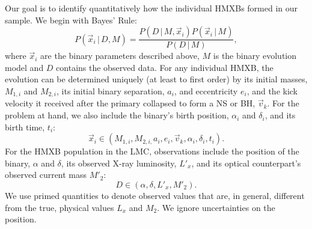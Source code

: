 \documentclass[12pt, preprint]{aastex}
\newcommand{\given}{\,|\,}
\begin{document}
Our goal is to identify quantitatively how the individual HMXBs formed in our sample. We begin with Bayes' Rule:
\begin{equation}
P( \vec{x}_i \given D, M ) = \frac{P( D \given M, \vec{x}_i ) P(\vec{x}_i \given M)}{P(D \given M)},
\end{equation}
where $\vec{x}_i$ are the binary parameters described above, $M$ is the binary evolution model and $D$ contains the observed data. For any individual HMXB, the evolution can be determined uniquely (at least to first order) by its initial masses, $M_{1,i}$ and $M_{2,i}$, its initial binary separation, $a_i$, and eccentricity $e_i$, and the kick velocity it received after the primary collapsed to form a NS or BH, $\vec{v}_k$. For the problem at hand, we also include the binary's birth position, $\alpha_i$ and $\delta_i$, and its birth time, $t_i$:
\begin{equation}
\vec{x}_i \in (M_{1,i}, M_{2,i,} a_i, e_i, \vec{v}_k, \alpha_i, \delta_i, t_i). \label{eq:x_i}
\end{equation}
For the HMXB population in the LMC, observations include the position of the binary, $\alpha$ and $\delta$, its observed X-ray luminosity, $L'_x$, and its optical counterpart's observed current mass $M'_2$:
\begin{equation}
D \in (\alpha, \delta, L'_x, M'_2). \label{eq:D}
\end{equation}
We use primed quantities to denote observed values that are, in general, different from the true, physical values $L_x$ and $M_2$. We ignore uncertainties on the position.
\end{document}
